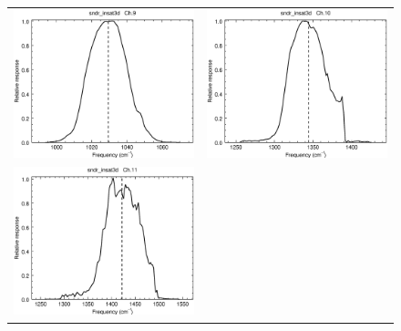 \begin{figure}[H]
\begin{tabular}{c c}
    \includegraphics[scale=0.35]{graphics/sndr/srf/sndr_insat3d-9.eps} &
    \includegraphics[scale=0.35]{graphics/sndr/srf/sndr_insat3d-10.eps} \\
    \includegraphics[scale=0.35]{graphics/sndr/srf/sndr_insat3d-11.eps} &

\end{tabular}
\end{figure}

